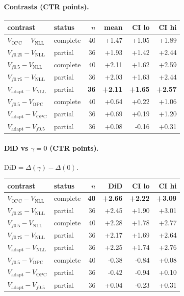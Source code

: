 \documentclass[10pt,a4paper]{article}
\begin{document}
\paragraph{Contrasts (CTR points).}
{\centering\small\begin{tabular}{llrrrr}
\toprule contrast & status & $n$ & mean & CI lo & CI hi \\
\midrule
$V_{\mathrm{OPC}}-V_{\mathrm{NLL}}$ & complete & 40 & +1.47 & +1.05 & +1.89 \\
$V_{f0.25}-V_{\mathrm{NLL}}$ & partial & 36 & +1.93 & +1.42 & +2.44 \\
$V_{f0.5}-V_{\mathrm{NLL}}$ & complete & 40 & +2.11 & +1.62 & +2.59 \\
$V_{f0.75}-V_{\mathrm{NLL}}$ & partial & 36 & +2.03 & +1.63 & +2.44 \\
\textbf{$V_{\mathrm{adapt}}-V_{\mathrm{NLL}}$} & partial & \textbf{36} & \textbf{+2.11} & \textbf{+1.65} & \textbf{+2.57} \\
$V_{f0.5}-V_{\mathrm{OPC}}$ & complete & 40 & +0.64 & +0.22 & +1.06 \\
$V_{\mathrm{adapt}}-V_{\mathrm{OPC}}$ & partial & 36 & +0.69 & +0.19 & +1.20 \\
$V_{\mathrm{adapt}}-V_{f0.5}$ & partial & 36 & +0.08 & -0.16 & +0.31 \\
\bottomrule\end{tabular}\par}
\paragraph{DiD vs $\gamma=0$ (CTR points).} $\mathrm{DiD}=\Delta(\gamma)-\Delta(0)$.
{\centering\small\begin{tabular}{llrrrr}
\toprule contrast & status & $n$ & DiD & CI lo & CI hi \\
\midrule
\textbf{$V_{\mathrm{OPC}}-V_{\mathrm{NLL}}$} & complete & \textbf{40} & \textbf{+2.66} & \textbf{+2.22} & \textbf{+3.09} \\
$V_{f0.25}-V_{\mathrm{NLL}}$ & partial & 36 & +2.45 & +1.90 & +3.01 \\
$V_{f0.5}-V_{\mathrm{NLL}}$ & complete & 40 & +2.28 & +1.78 & +2.77 \\
$V_{f0.75}-V_{\mathrm{NLL}}$ & partial & 36 & +2.17 & +1.69 & +2.64 \\
$V_{\mathrm{adapt}}-V_{\mathrm{NLL}}$ & partial & 36 & +2.25 & +1.74 & +2.76 \\
$V_{f0.5}-V_{\mathrm{OPC}}$ & complete & 40 & -0.38 & -0.84 & +0.08 \\
$V_{\mathrm{adapt}}-V_{\mathrm{OPC}}$ & partial & 36 & -0.42 & -0.94 & +0.10 \\
$V_{\mathrm{adapt}}-V_{f0.5}$ & partial & 36 & +0.04 & -0.23 & +0.31 \\
\bottomrule\end{tabular}\par}
\bigskip
\end{document}
